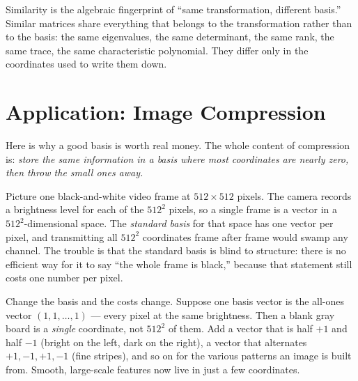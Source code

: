 Similarity is the algebraic fingerprint of ``same transformation, different basis.'' Similar matrices share everything that belongs to the transformation rather than to the basis: the same eigenvalues, the same determinant, the same rank, the same trace, the same characteristic polynomial. They differ only in the coordinates used to write them down.


\section{Application: Image Compression}

Here is why a good basis is worth real money. The whole content of compression is: \emph{store the same information in a basis where most coordinates are nearly zero, then throw the small ones away.}

Picture one black-and-white video frame at $512\times 512$ pixels. The camera records a brightness level for each of the $512^2$ pixels, so a single frame is a vector in a $512^2$-dimensional space. The \emph{standard basis} for that space has one vector per pixel, and transmitting all $512^2$ coordinates frame after frame would swamp any channel. The trouble is that the standard basis is blind to structure: there is no efficient way for it to say ``the whole frame is black,'' because that statement still costs one number per pixel.

Change the basis and the costs change. Suppose one basis vector is the all-ones vector $(1,1,\dots,1)$ --- every pixel at the same brightness. Then a blank gray board is a \emph{single} coordinate, not $512^2$ of them. Add a vector that is half $+1$ and half $-1$ (bright on the left, dark on the right), a vector that alternates $+1,-1,+1,-1$ (fine stripes), and so on for the various patterns an image is built from. Smooth, large-scale features now live in just a few coordinates.


